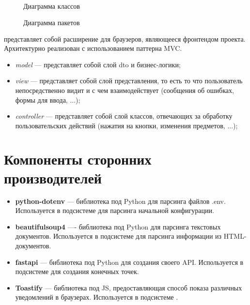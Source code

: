 		\subsection{\Extension{}}
			\begin{figure}[H]
				\centering
				\def\svgwidth{\columnwidth}
				
				\caption{Диаграмма классов \Extensionbf}
			\end{figure}
			
			\begin{figure}[H]
				\centering
				\def\svgwidth{\columnwidth}
				
				\caption{Диаграмма пакетов \Extensionbf}
			\end{figure}
			
			\Extensionbf{} представляет собой расширение для браузеров, являющееся фронтендом проекта. Архитектурно \Extensionbf{} реализован с использованием паттерна MVC.
			
			\begin{itemize}
				\item \textit{model} --- представляет собой слой dto и бизнес-логики;
				
				\item \textit{view} --- представляет собой слой представления, то есть то что пользователь непосредственно видит и с чем взаимодействует (сообщения об ошибках, формы для ввода, ...);
				
				\item \textit{controller} --- представляет собой слой классов, отвечающих за обработку пользовательских действий (нажатия на кнопки, изменения предметов, ...);
			\end{itemize}
	\section{Компоненты сторонних производителей}	
		\begin{itemize}
			\item \textbf{python-dotenv} --- библиотека под Python для парсинга файлов .env. Используется в подсистеме \Serverbf{} для парсинга начальной конфигурации.
			
			\item \textbf{beautifulsoup4} ---- библиотека под Python для парсинга текстовых документов. Используется в подсистеме \Serverbf{} для парсинга информации из HTML-документов.
			
			\item \textbf{fastapi} --- библиотека под Python для создания своего API. Используется в подсистеме \Serverbf{} для создания конечных точек.
			
			\item \textbf{Toastify} --- библиотека под JS, предоставляющая способ показа различных уведомлений в браузерах. Используется в подсистеме \Extensionbf{}.
		\end{itemize}
